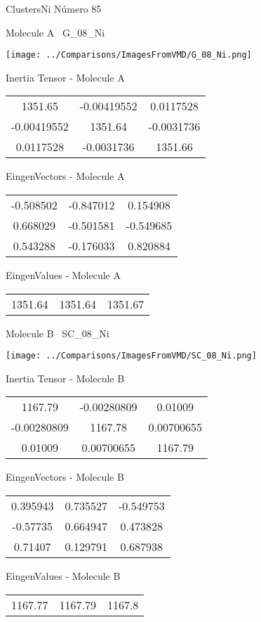  \newpage

\vtab[-3cm]
\begin{center}
{\large ClustersNi \tab Número 85}
\end{center}
\begin{multicols}{2}
\begin{center}

Molecule A \
G\_08\_Ni

\texttt{[image: ../Comparisons/ImagesFromVMD/G\_08\_Ni.png]}

Inertia Tensor - Molecule A \\
\begin{tabular}{|c c c|}
1351.65	 & 	-0.00419552	 & 	0.0117528	 \\
-0.00419552	 & 	1351.64	 & 	-0.0031736	 \\
0.0117528	 & 	-0.0031736	 & 	1351.66
\end{tabular}

\vtab
 EingenVectors - Molecule A     \\
\begin{tabular}{|c c c|}
-0.508502	 & 	-0.847012	 & 	0.154908	 \\
0.668029	 & 	-0.501581	 & 	-0.549685	 \\
0.543288	 & 	-0.176033	 & 	0.820884
\end{tabular}

\vtab
 EingenValues - Molecule A     \\
\begin{tabular}{|c c c|}
1351.64	 & 	1351.64	 & 	1351.67	 \\
\end{tabular}
\columnbreak

Molecule B \
SC\_08\_Ni

\texttt{[image: ../Comparisons/ImagesFromVMD/SC\_08\_Ni.png]}

Inertia Tensor - Molecule B \\
\begin{tabular}{|c c c|}
1167.79	 & 	-0.00280809	 & 	0.01009	 \\
-0.00280809	 & 	1167.78	 & 	0.00700655	 \\
0.01009	 & 	0.00700655	 & 	1167.79
\end{tabular}

\vtab
 EingenVectors - Molecule B     \\
\begin{tabular}{|c c c|}
0.395943	 & 	0.735527	 & 	-0.549753	 \\
-0.57735	 & 	0.664947	 & 	0.473828	 \\
0.71407	 & 	0.129791	 & 	0.687938
\end{tabular}

\vtab
 EingenValues - Molecule B     \\
\begin{tabular}{|c c c|}
1167.77	 & 	1167.79	 & 	1167.8	 \\
\end{tabular}

\end{center}
\end{multicols}

